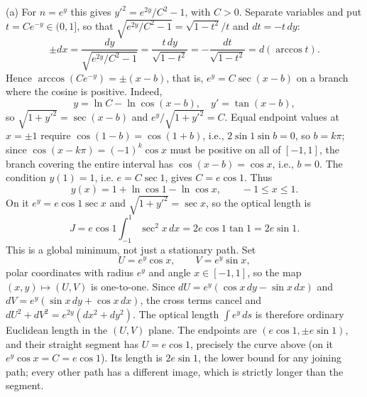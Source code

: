 (a) For $n=e^y$ this gives $y'^2=e^{2y}/C^2-1$, with $C>0$. Separate
variables and put $t=Ce^{-y}\in(0,1]$, so that
$\sqrt{e^{2y}/C^2-1}=\sqrt{1-t^2}/t$ and $dt=-t\,dy$:
\[
\pm dx=\frac{dy}{\sqrt{e^{2y}/C^2-1}}
=\frac{t\,dy}{\sqrt{1-t^2}}
=-\frac{dt}{\sqrt{1-t^2}}=d(\arccos t).
\]
Hence $\arccos(Ce^{-y})=\pm(x-b)$, that is, $e^y=C\sec(x-b)$ on a
branch where the cosine is positive. Indeed,
\[
y=\ln C-\ln\cos(x-b),\quad y'=\tan(x-b),
\]
so $\sqrt{1+y'^2}=\sec(x-b)$ and $e^y/\sqrt{1+y'^2}=C$. Equal endpoint
values at $x=\pm1$ require $\cos(1-b)=\cos(1+b)$, i.e.,
$2\sin1\sin b=0$, so $b=k\pi$; since
$\cos(x-k\pi)=(-1)^k\cos x$ must be positive on all of $[-1,1]$, the
branch covering the entire interval has $\cos(x-b)=\cos x$, i.e.,
$b=0$. The condition $y(1)=1$, i.e. $e=C\sec1$, gives $C=e\cos1$. Thus
\[
\boxed{y(x)=1+\ln\cos1-\ln\cos x,\qquad -1\le x\le1}.
\]
On it $e^y=e\cos1\sec x$ and $\sqrt{1+y'^2}=\sec x$, so the optical
length is
\[
J=e\cos1\int_{-1}^1\sec^2x\,dx=2e\cos1\tan1=2e\sin1.
\]
This is a global minimum, not just a stationary path. Set
\[
U=e^y\cos x,\qquad V=e^y\sin x,
\]
polar coordinates with radius $e^y$ and angle $x\in[-1,1]$, so the
map $(x,y)\mapsto(U,V)$ is one-to-one. Since
$dU=e^y(\cos x\,dy-\sin x\,dx)$ and $dV=e^y(\sin x\,dy+\cos x\,dx)$,
the cross terms cancel and $dU^2+dV^2=e^{2y}(dx^2+dy^2)$.
The optical length $\int e^y\,ds$ is therefore ordinary Euclidean
length in the $(U,V)$ plane. The endpoints are $(e\cos1,\pm e\sin1)$,
and their straight segment has $U=e\cos1$, precisely the curve above
(on it $e^y\cos x=C=e\cos1$). Its length is $2e\sin1$, the lower bound
for any joining path; every other path has a different image, which is
strictly longer than the segment.


